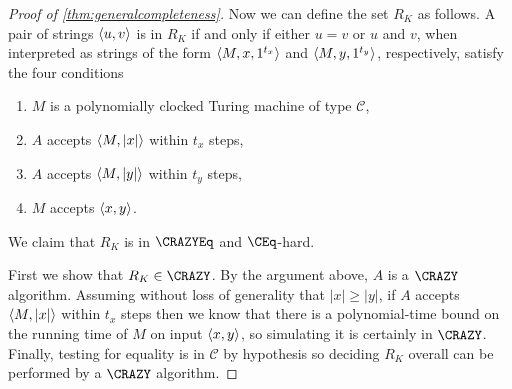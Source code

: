\begin{proof}[Proof of \autoref{thm:generalcompleteness}]
  Now we can define the set $R_K$ as follows.
  A pair of strings $\langle u,v\rangle$ is in $R_K$ if and only if either $u = v$ or $u$ and $v$, when interpreted as strings of the form $\left\langle M,x,1^{t_x}\right\rangle$ and $\left\langle M,y,1^{t_y}\right\rangle$, respectively, satisfy the four conditions
  \begin{enumerate}
  \item\label{itm:machine} $M$ is a polynomially clocked Turing machine of type $\mathcal{C}$,
  \item\label{itm:emx} $A$ accepts $\langle M,|x|\rangle$ within $t_x$ steps,
  \item\label{itm:emy} $A$ accepts $\langle M,|y|\rangle$ within $t_y$ steps,
  \item\label{itm:accepts} $M$ accepts $\langle x,y\rangle$.
  \end{enumerate}
  We claim that $R_K$ is in $\CRAZYEq$ and $\CEq$-hard.

  First we show that $R_K\in\CRAZY$.
  By the argument above, $A$ is a $\CRAZY$ algorithm.
  Assuming without loss of generality that $|x|\geq |y|$, if $A$ accepts $\langle M,|x|\rangle$ within $t_x$ steps then we know that there is a polynomial-time bound on the running time of $M$ on input $\langle x,y\rangle$, so simulating it is certainly in $\CRAZY$.
  Finally, testing for equality is in $\mathcal{C}$ by hypothesis so deciding $R_K$ overall can be performed by a $\CRAZY$ algorithm.


\end{proof}
